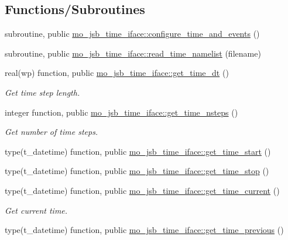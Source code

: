 \subsection*{Functions/\+Subroutines}
\begin{DoxyCompactItemize}
\item 
subroutine, public \hyperlink{namespacemo__jsb__time__iface_a72043de558313d19de7e74737fb0d405}{mo\+\_\+jsb\+\_\+time\+\_\+iface\+::configure\+\_\+time\+\_\+and\+\_\+events} ()
\item 
subroutine, public \hyperlink{namespacemo__jsb__time__iface_aa849b3904eff063cc37a76aeb2cc9e2d}{mo\+\_\+jsb\+\_\+time\+\_\+iface\+::read\+\_\+time\+\_\+namelist} (filename)
\item 
real(wp) function, public \hyperlink{namespacemo__jsb__time__iface_ab168c46be9abca5f386500550a020775}{mo\+\_\+jsb\+\_\+time\+\_\+iface\+::get\+\_\+time\+\_\+dt} ()
\begin{DoxyCompactList}\small\item\em Get time step length. \end{DoxyCompactList}\item 
integer function, public \hyperlink{namespacemo__jsb__time__iface_a3f7d59d4cfa4bebbe8460d5649b660df}{mo\+\_\+jsb\+\_\+time\+\_\+iface\+::get\+\_\+time\+\_\+nsteps} ()
\begin{DoxyCompactList}\small\item\em Get number of time steps. \end{DoxyCompactList}\item 
type(t\+\_\+datetime) function, public \hyperlink{namespacemo__jsb__time__iface_ae2944548df61fb74efc201b6f7638abc}{mo\+\_\+jsb\+\_\+time\+\_\+iface\+::get\+\_\+time\+\_\+start} ()
\item 
type(t\+\_\+datetime) function, public \hyperlink{namespacemo__jsb__time__iface_ac6e0e1e6c162a0d29f99e6ec9988a664}{mo\+\_\+jsb\+\_\+time\+\_\+iface\+::get\+\_\+time\+\_\+stop} ()
\item 
type(t\+\_\+datetime) function, public \hyperlink{namespacemo__jsb__time__iface_adbc8c1cd58176897cabb83ffbb84ad31}{mo\+\_\+jsb\+\_\+time\+\_\+iface\+::get\+\_\+time\+\_\+current} ()
\begin{DoxyCompactList}\small\item\em Get current time. \end{DoxyCompactList}\item 
type(t\+\_\+datetime) function, public \hyperlink{namespacemo__jsb__time__iface_aa475436175297ff2a5f9969a176d17da}{mo\+\_\+jsb\+\_\+time\+\_\+iface\+::get\+\_\+time\+\_\+previous} ()

\end{DoxyCompactItemize}
